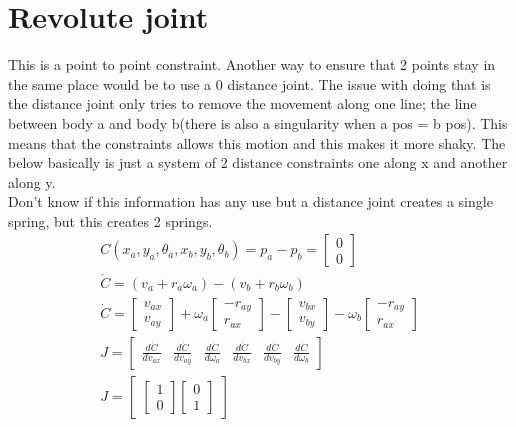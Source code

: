 \documentclass{article}
\begin{document}
\section*{Revolute joint}
This is a point to point constraint. Another way to ensure that 2 points stay in the same place would be to use a 0 distance joint. The issue with doing that is the distance joint only tries to remove the movement along one line; the line between body a and body b(there is also a singularity when a pos = b pos). This means that the constraints allows this motion and this makes it more shaky. The below basically is just a system of 2 distance constraints one along x and another along y. \\
Don't know if this information has any use but a distance joint creates a single spring, but this creates 2 springs.
\begin{gather}
C(x_a, y_a, \theta_a, x_b, y_b, \theta_b) = p_a - p_b = \begin{bmatrix} 0 \\ 0 \end{bmatrix} \\
\dot C  = (v_a + r_a \omega_a) - (v_b + r_b \omega_b) \\
\dot C = \begin{bmatrix} v_{ax} \\ v_{ay} \end{bmatrix} + \omega_a \begin{bmatrix} -r_{ay} \\ r_{ax} \end{bmatrix} -
\begin{bmatrix} v_{bx} \\ v_{by} \end{bmatrix} - \omega_b \begin{bmatrix} -r_{ay} \\ r_{ax} \end{bmatrix} \\
J = \begin{bmatrix} \frac{d\dot C}{dv_{ax}} & \frac{d\dot C}{dv_{ay}} & \frac{d\dot C}{d\omega_a} & \frac{d\dot C}{dv_{bx}} & \frac{d\dot C}{dv_{by}} & \frac{d\dot C}{d\omega_b} \end{bmatrix} \\
J = \begin{bmatrix}  
	\begin{bmatrix} 1 \\ 0  \end{bmatrix}
	\begin{bmatrix} 0 \\ 1 \end{bmatrix}

\end{bmatrix}
\end{gather}
\end{document}
